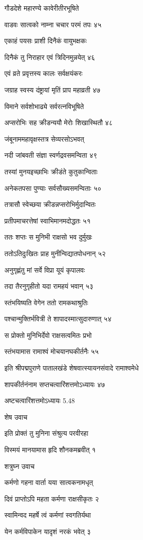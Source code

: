 गौडदेशे महारण्ये कावेरीतीरभूषिते

वाडवः सात्वको नाम्ना चचार परमं तपः ४५

एकाहं पयसः प्राशी दिनैकं वायुभक्षकः

दिनैकं तु निराहार एवं त्रिदिनमुन्नयेत् ४६

एवं व्रते प्रवृत्तस्य कालः सर्वक्षयंकरः

जग्राह स्वस्य दंष्ट्रायां मृतिं प्राप महाव्रती ४७

विमाने सर्वशोभाढ्ये सर्वरत्नविभूषिते

अप्सरोभिः सह क्रीडन्ययौ मेरोः शिखास्थितौ ४८

जंबूनाममहावृक्षस्तत्र सेव्यरसोऽभवत्

नदी जांबवती संज्ञा स्वर्णद्रवसमन्विता ४९

तस्यां मुनयइच्छाभिः क्रीडंते कुतुकान्विताः

अनेकतपसा पुण्याः सर्वसौख्यसमन्विताः ५०

तत्रासौ स्वेच्छया क्रीडन्नप्सरोभिर्मुदान्वितः

प्रतीपमाचरत्तेषां स्वाभिमानमदोद्धतः ५१

ततः शप्तः स मुनिभी राक्षसो भव दुर्मुखः

ततोऽतिदुःखितः प्राह मुनीन्विद्यातपोधनान् ५२

अनुगृह्णंतु मां सर्वे विप्रा यूयं कृपालवः

तदा तैरनुगृहीतो यदा रामहयं भवान् ५३

स्तंभयिष्यति वेगेन ततो रामकथाश्रुतिः

पश्चान्मुक्तिर्भवित्री ते शापादस्मात्सुदारुणात् ५४

स प्रोक्तो मुनिभिर्देवो राक्षसत्वमितः प्रभो

स्तंभयामास रामाश्वं मोचयानघकीर्तनैः ५५

इति श्रीपद्मपुराणे पातालखंडे शेषवात्स्यायनसंवादे रामाश्वमेधे

शापकीर्तनंनाम सप्तचत्वारिंशत्तमोऽध्यायः ४७

अष्टचत्वारिंशत्तमोऽध्यायः 5.48

शेष उवाच

इति प्रोक्तं तु मुनिना संश्रुत्य परवीरहा

विस्मयं मानयामास हृदि शौनकमब्रवीत् १

शत्रुघ्न उवाच

कर्मणो गहना वार्ता यया सात्वकनामधृत्

दिवं प्राप्तोऽपि महता कर्मणा राक्षसीकृतः २

स्वामिन्वद महर्षे त्वं कर्मणां स्वगतिर्यथा

येन कर्मविपाकेन यादृशं नरकं भवेत् ३

